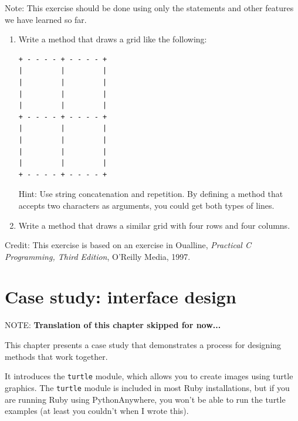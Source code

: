 \documentclass[10pt]{book}
\begin{document}
\begin{exercise}

Note: This exercise should be
done using only the statements and other features we have learned so
far.  

\begin{enumerate}

\item Write a method that draws a grid like the following:

\begin{verbatim}
+ - - - - + - - - - +
|         |         |
|         |         |
|         |         |
|         |         |
+ - - - - + - - - - +
|         |         |
|         |         |
|         |         |
|         |         |
+ - - - - + - - - - +
\end{verbatim}
%
Hint: Use string concatenation and repetition.  By defining
a method that accepts two characters as arguments, you could
get both types of lines.

\item Write a method that draws a similar grid
with four rows and four columns.

\end{enumerate}

Credit: This exercise is based on an exercise in Oualline, {\em
    Practical C Programming, Third Edition}, O'Reilly Media, 1997.

\end{exercise}





\chapter{Case study: interface design}
\label{turtlechap}


NOTE: {\bf Translation of this chapter skipped for now...}



This chapter presents a case study that demonstrates a process for
designing methods that work together.

It introduces the {\tt turtle} module, which allows you to
create images using turtle graphics.  The {\tt turtle} module is
included in most Ruby installations, but if you are running Ruby
using PythonAnywhere, you won't be able to run the turtle examples (at
least you couldn't when I wrote this).
\end{document}
